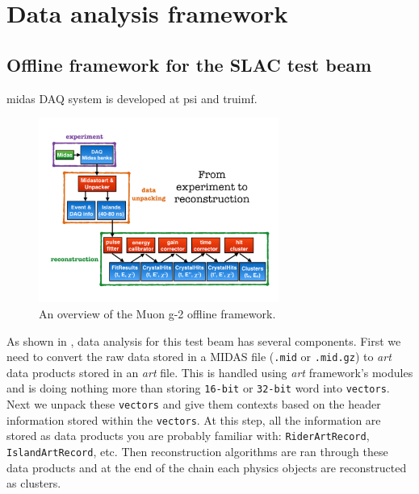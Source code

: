 \chapter{Data analysis framework}
\label{chap:artframework}

\section{Offline framework for the SLAC test beam}

\ac{midas} DAQ system is developed at \ac{psi} and \ac{truimf}.

\begin{figure}[htbp]
\centering
\includegraphics[width=0.7\textwidth]{pics/offline_exp_framework}
\caption{An overview of the Muon g-2 offline framework.}
\label{pic:exp_framework}
\end{figure}

As shown in , data analysis for this test beam has several components. First we need to convert the raw data stored in a MIDAS file (\verb+.mid+ or \verb+.mid.gz+) to \textit{art} data products stored in an \textit{art} file.
This is handled using \textit{art} framework's modules and is doing nothing more than storing \verb+16-bit+ or \verb+32-bit+ word into \verb+vectors+. Next we unpack these \verb+vectors+
and give them contexts based on the header information stored within the \verb+vectors+. At this step, all the information are stored as data products you are probably familiar with: \verb+RiderArtRecord+,
\verb+IslandArtRecord+, etc. Then reconstruction algorithms are ran through these data products and at the end of the chain each physics objects are reconstructed as clusters.



